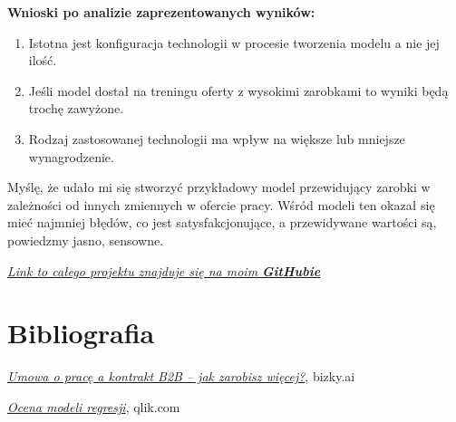 \documentclass[a4paper]{article}
\begin{document}
\textbf{Wnioski po analizie zaprezentowanych wyników:}

\begin{enumerate}
    \item Istotna jest konfiguracja technologii w procesie tworzenia modelu a nie jej ilość.
    \item Jeśli model dostał na treningu oferty z wysokimi zarobkami to wyniki będą trochę zawyżone.
    \item Rodzaj zastosowanej technologii ma wpływ na większe lub mniejsze wynagrodzenie.
\end{enumerate}

\quad Myślę, że udało mi się stworzyć przykładowy model przewidujący zarobki w zależności od innych
zmiennych w ofercie pracy. Wśród modeli ten okazał się mieć najmniej błędów, co jest
satysfakcjonujące, a przewidywane wartości są, powiedzmy jasno, sensowne.\\

\begin{center}
    \href{https://github.com/lukaszfabia/RaportIT}{\textit{Link to całego projektu znajduje się na moim \textbf{GitHubie}}}
\end{center}


\section{Bibliografia}

\begin{thebibliography}{9}
    \href{https://bizky.ai/blog/umowa-o-prace-a-kontrakt-b2b-co-sie-bardziej-oplaca/}{\textit{Umowa o pracę a kontrakt B2B – jak zarobisz więcej?}}, bizky.ai

    \href{https://help.qlik.com/pl-PL/cloud-services/Subsystems/Hub/Content/Sense_Hub/AutoML/scoring-regression.htm}{\textit{Ocena modeli regresji}}, qlik.com
\end{thebibliography}
\end{document}
